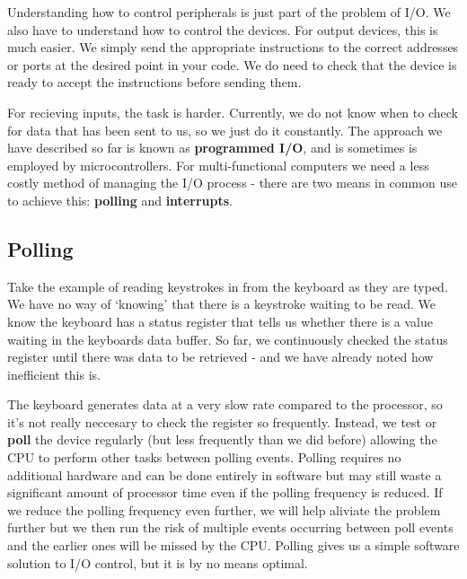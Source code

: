 \documentclass{article}
\begin{document}
	\par 
	Understanding how to control peripherals is just part of the problem of I/O. We also have to understand how to control the devices. For output devices, this is much easier. We simply send the appropriate instructions to the correct addresses or ports at the desired point in your code. We do need to check that the device is ready to accept the instructions before sending them. 
	
	\par 
	For recieving inputs, the task is harder. Currently, we do not know when to check for data that has been sent to us, so we just do it constantly. The approach we have described so far is known as \textbf{programmed I/O}, and is sometimes is employed by microcontrollers. For multi-functional computers we need a less costly method of managing the I/O process - there are two means in common use to achieve this: \textbf{polling} and \textbf{interrupts}.
	
	\subsection{Polling}
	Take the example of reading keystrokes in from the keyboard as they are typed. We have no way of `knowing' that there is a keystroke waiting to be read. We know the keyboard has a status register that tells us whether there is a value waiting in the keyboards data buffer. So far, we continuously checked the status register until there was data to be retrieved - and we have already noted how inefficient this is.
	
	\par 
	The keyboard generates data at a very slow rate compared to the processor, so it's not really neccesary to check the register so frequently. Instead, we test or \textbf{poll} the device regularly (but less frequently than we did before) allowing the CPU to perform other tasks between polling events. Polling requires no additional hardware and can be done entirely in software but may still waste a significant amount of processor time even if the polling frequency is reduced. If we reduce the polling frequency even further, we will help aliviate the problem further but we then run the risk of multiple events occurring between poll events and the earlier ones will be missed by the CPU. Polling gives us a simple software solution to I/O control, but it is by no means optimal.
	
\end{document}
